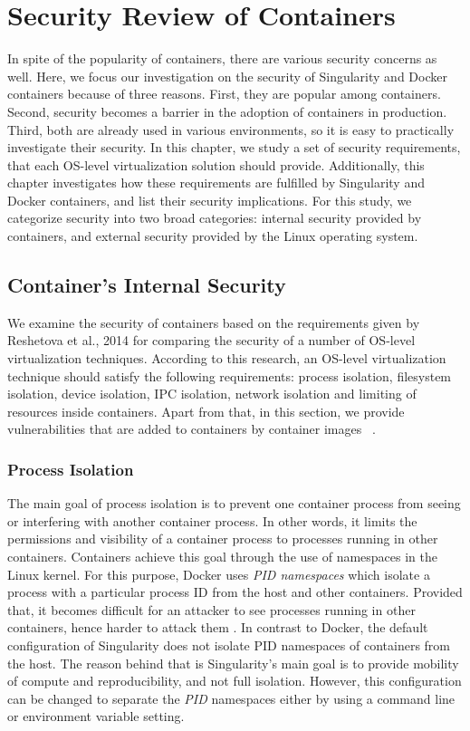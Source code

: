 \chapter{Security Review of Containers}\label{chapter2}	

In spite of the popularity of containers, there are various security
concerns as well. Here, we focus our investigation on the security
of Singularity and Docker containers because of three reasons.
First, they are popular among containers.
Second, security becomes a barrier in the adoption of containers in
production. Third, both are already
used in various environments, so it is easy to practically
investigate their security. In this chapter, we study a set of security
requirements, that each OS-level virtualization solution should provide.
Additionally, this chapter investigates how these requirements are fulfilled
by Singularity and Docker containers, and list their security implications.
For this study, we categorize security into two broad categories: internal
security provided by containers, and external security
provided by the Linux operating system.

\section{Container's Internal Security}

We examine the security of containers based on the requirements given
by Reshetova et al., 2014 \cite{reshetova2014security} for comparing
the security of a number of OS-level virtualization techniques.
According to this research, an OS-level virtualization technique should
satisfy the following requirements: process isolation, filesystem isolation,
device isolation, IPC isolation, network isolation and limiting
of resources inside containers. Apart from that, in this section, we provide vulnerabilities
that are added to containers by container images ~\cite{cappos2008look, gummaraju2015over}.

\subsection{Process Isolation}

The main goal of process isolation is to prevent one container process
from seeing or interfering with another container process. In other words,
it limits the permissions and visibility of a container process to
processes running in other containers. Containers achieve this goal
through the use of namespaces in the Linux kernel. For this purpose,
Docker uses \textit{PID namespaces} which isolate a process with a
particular process ID from the host and other containers. Provided
that, it becomes difficult for an attacker to see processes running
in other containers, hence harder to attack them \cite{bui2015analysis}.
In contrast to Docker, the default configuration of Singularity does
not isolate PID namespaces of containers from the host.
The reason behind that is Singularity's main goal is to provide
mobility of compute and reproducibility, and not full isolation.
However, this configuration can be changed to separate the \textit{PID}
namespaces either by using a command line or environment variable setting.

